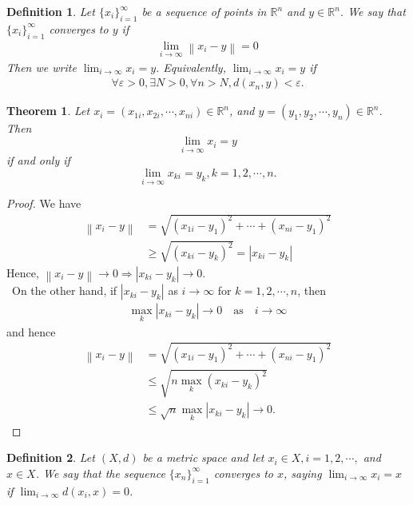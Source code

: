 \documentclass[12pt,leqno]{amsart}
\newtheorem{definition}{Definition}[section]
\newtheorem{theorem}{Theorem}[section]
\theoremstyle{definition}
\numberwithin{equation}{subsection}
\begin{document}
\begin{definition}
Let $\{x_i\}^\infty_{i=1}$ be a sequence of points in $\mathbb{R}^n$ and $y\in\mathbb{R}^n$. We say that $\{x_i\}^\infty_{i=1}$ converges to $y$ if 
\begin{align*}
    \lim_{i\to\infty}\left\|x_i - y \right\| = 0
\end{align*}
Then we write $\lim_{i\to\infty}x_i = y$. Equivalently, $\lim_{i\to\infty}x_i = y$ if \begin{align*}
    \forall \varepsilon > 0, \exists N > 0, \forall n > N, d(x_n, y) < \varepsilon.
\end{align*}
\end{definition}

\medskip

\begin{theorem}
Let $x_i = (x_{1i}, x_{2i}, \cdots, x_{ni}) \in \mathbb{R}^n$, and $y = (y_{1}, y_{2}, \cdots, y_{n}) \in \mathbb{R}^n$. Then 
$$\lim_{i\to\infty}x_i = y$$ if and only if $$\lim_{i\to\infty}x_{ki} = y_k,k = 1,2,\cdots,n.$$
\end{theorem}
\begin{proof}
We have 
\begin{align*}
    \left\|x_i - y\right\| & = \sqrt{(x_{1i}-y_1)^2 + \cdots + (x_{ni}-y_1)^2} \\
    & \geq \sqrt{(x_{ki}-y_k)^2} = |x_{ki} - y_k|
\end{align*}
Hence, $\left\|x_i - y\right\| \to 0 \Rightarrow |x_{ki} - y_k| \to 0$.\\
\hspace*{1em}\, On the other hand, if $|x_{ki} - y_k|$ as $i\to\infty$ for $k = 1,2,\cdots, n$, then 
\begin{align*}
    \max_k |x_{ki} - y_k| \to 0 \quad \text{as}\quad i\to\infty
\end{align*}
and hence
\begin{align*}
    \left\|x_i - y\right\| & = \sqrt{(x_{1i}-y_1)^2 + \cdots + (x_{ni}-y_1)^2} \\
    & \leq \sqrt{n \max_k (x_{ki}-y_k)^2} \\
    & \leq \sqrt{n} \max_k |x_{ki} - y_k| \to 0.
\end{align*}
\end{proof}

\begin{definition}
Let $(X,d)$ be a metric space and let $x_i\in X, i = 1,2,\cdots,$ and $x\in X$. We say that the sequence $\{x_n\}^\infty_{i=1}$ converges to $x$, saying
$\lim_{i\to\infty}x_i = x$ if $\lim_{i\to\infty}d(x_i, x) = 0$.
\end{definition}
\end{document}
